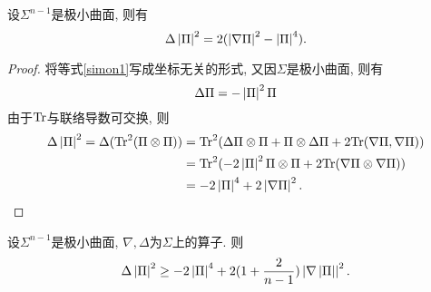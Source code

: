 \begin{proposition} \label{simon_equation}
    设$\Sigma^{n-1}$是极小曲面, 则有
    \begin{equation}
        \Delta\left | {\Pi} \right |^2 = 2(\left | \nabla {\Pi} \right |^2-\left | {\Pi} \right |^4).
    \end{equation}
\end{proposition}
\begin{proof}
    将等式\eqref{simon1}写成坐标无关的形式, 又因$\Sigma$是极小曲面, 则有
    \begin{equation}
        \Delta {\Pi} = -\left | {\Pi} \right |^2 {\Pi}
    \end{equation}
    由于$\text{Tr}$与联络导数可交换, 则
    \begin{equation}
        \begin{split}
            \Delta \left | {\Pi} \right |^2 = \Delta (\text{Tr}^2({\Pi}\otimes{\Pi})) &= \text{Tr}^2(\Delta {\Pi} \otimes{\Pi} + {\Pi} \otimes \Delta {\Pi} + 2 \text{Tr}(\nabla {\Pi}, \nabla {\Pi})) \\
            &=\text{Tr}^2(-2\left | {\Pi} \right |^2 {\Pi}\otimes{\Pi}+2\text{Tr}(\nabla {\Pi} \otimes \nabla {\Pi})) \\
            &=-2\left | {\Pi} \right |^4+2\left | \nabla {\Pi} \right |^2.
        \end{split}
    \end{equation}
\end{proof}
\begin{proposition}
    设$\Sigma^{n-1}$是极小曲面, $\nabla,\Delta$为$\Sigma$上的算子. 则
    \begin{equation} \label{simon_inequality}
        \Delta \left | {\Pi} \right |^2 \ge -2\left | {\Pi} \right |^4+2(1+\frac{2}{n-1})\left | \nabla \left | {\Pi} \right | \right |^2.
    \end{equation}
\end{proposition}
